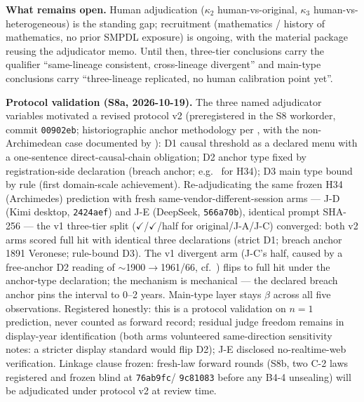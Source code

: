 \textbf{What remains open.} Human adjudication ($\kappa_2$
human-vs-original, $\kappa_3$ human-vs-heterogeneous) is the
standing gap; recruitment (mathematics / history of mathematics,
no prior SMPDL exposure) is ongoing, with the material package
reusing the adjudicator memo. Until then, three-tier conclusions
carry the qualifier ``same-lineage consistent, cross-lineage
divergent'' and main-type conclusions carry ``three-lineage
replicated, no human calibration point yet''.

\textbf{Protocol validation (S8a, 2026-10-19).} The three named
adjudicator variables motivated a revised protocol v2
(preregistered in the S8 workorder, commit \texttt{00902eb};
historiographic anchor methodology per
\citealp{corry2004modern}, with the non-Archimedean case
documented by \citealp{ehrlich2006rise}): D1 causal threshold as
a declared menu with a one-sentence direct-causal-chain
obligation; D2 anchor type fixed by registration-side declaration
(breach anchor; e.g.\ \citealp{veronese1891continuo} for H34);
D3 main type bound by rule (first domain-scale achievement).
Re-adjudicating the same frozen H34 (Archimedes) prediction with
fresh same-vendor-different-session arms --- J-D (Kimi desktop,
\texttt{2424aef}) and J-E (DeepSeek, \texttt{566a70b}), identical
prompt SHA-256 --- the v1 three-tier split
($\checkmark$/$\checkmark$/half for original/J-A/J-C) converged:
both v2 arms scored full hit with identical three declarations
(strict D1; breach anchor 1891 Veronese; rule-bound D3). The
v1 divergent arm (J-C's half, caused by a free-anchor D2 reading
of $\sim$1900$\to$1961/66, cf.\ \citealp{hahn1907nichtarchimedischen,
robinson1961nonstandard}) flips to full hit under the
anchor-type declaration; the mechanism is mechanical --- the
declared breach anchor pins the interval to 0--2 years. Main-type
layer stays $\beta$ across all five observations. Registered
honestly: this is a protocol validation on $n=1$ prediction,
never counted as forward record; residual judge freedom remains
in display-year identification (both arms volunteered
same-direction sensitivity notes: a stricter display standard
would flip D2); J-E disclosed no-realtime-web verification.
Linkage clause frozen: fresh-law forward rounds (S8b, two C-2
laws registered and frozen blind at \texttt{76ab9fc}/
\texttt{9c81083} before any B4-4 unsealing) will be adjudicated
under protocol v2 at review time.
